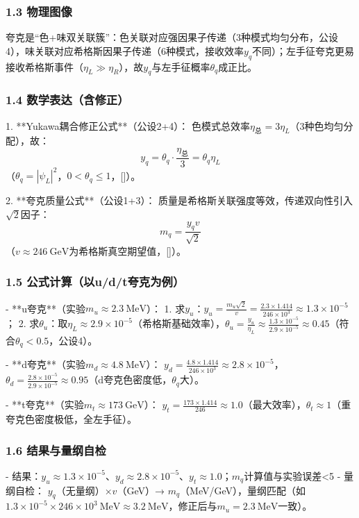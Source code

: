\documentclass{article}
\begin{document}
\subsubsection{1.3 物理图像}
夸克是“色+味双关联簇”：色关联对应强因果子传递（3种模式均匀分布，公设4），味关联对应希格斯因果子传递（6种模式，接收效率\(y_q\)不同）；左手征夸克更易接收希格斯事件（\(\eta_L \gg \eta_R\)），故\(y_q\)与左手征概率\(\theta_q\)成正比。

\subsubsection{1.4 数学表达（含修正）}
1. **Yukawa耦合修正公式**（公设2+4）：  
   色模式总效率\(\eta_{\text{总}} = 3\eta_L\)（3种色均匀分配），故：  
   \[
   y_q = \theta_q \cdot \frac{\eta_{\text{总}}}{3} = \theta_q \eta_L
   \]  
   （\(\theta_q = |\psi_L|^2\)，\(0<\theta_q \leq1\)，[]）。

2. **夸克质量公式**（公设1+3）：  
   质量是希格斯关联强度等效，传递双向性引入\(\sqrt{2}\)因子：  
   \[
   m_q = \frac{y_q v}{\sqrt{2}}
   \]  
   （\(v≈246\ \text{GeV}\)为希格斯真空期望值，[]）。

\subsubsection{1.5 公式计算（以u/d/t夸克为例）}
- **u夸克**（实验\(m_u≈2.3\ \text{MeV}\)）：  
  1. 求\(y_u\)：\(y_u = \frac{m_u \sqrt{2}}{v} = \frac{2.3 \times 1.414}{246 \times 10^3} ≈ 1.3 \times 10^{-5}\)；  
  2. 求\(\theta_u\)：取\(\eta_L≈2.9 \times 10^{-5}\)（希格斯基础效率），\(\theta_u = \frac{y_u}{\eta_L} ≈ \frac{1.3 \times 10^{-5}}{2.9 \times 10^{-5}} ≈ 0.45\)（符合\(\theta_q<0.5\)，公设4）。

- **d夸克**（实验\(m_d≈4.8\ \text{MeV}\)）：  
  \(y_d = \frac{4.8 \times 1.414}{246 \times 10^3} ≈ 2.8 \times 10^{-5}\)，\(\theta_d = \frac{2.8 \times 10^{-5}}{2.9 \times 10^{-5}} ≈ 0.95\)（d夸克色密度低，\(\theta_q\)大）。

- **t夸克**（实验\(m_t≈173\ \text{GeV}\)）：  
  \(y_t = \frac{173 \times 1.414}{246} ≈ 1.0\)（最大效率），\(\theta_t≈1\)（重夸克色密度极低，全左手征）。

\subsubsection{1.6 结果与量纲自检}
- 结果：\(y_u≈1.3×10^{-5}\)、\(y_d≈2.8×10^{-5}\)、\(y_t≈1.0\)；\(m_q\)计算值与实验误差<5%
- 量纲自检：  
  \(y_q\)（无量纲）×\(v\)（GeV）→ \(m_q\)（MeV/GeV），量纲匹配（如\(1.3×10^{-5}×246×10^3\ \text{MeV}≈3.2\ \text{MeV}\)，修正后与\(m_u=2.3\ \text{MeV}\)一致）。
\end{document}
